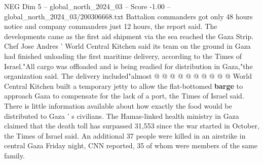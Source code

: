 \begin{textsample}{NEG Dim 5 – global\_north\_2024\_03 – Score -1.00 – global\_north\_2024\_03/200306668.txt}
Battalion commanders got only 48 hours notice and company commanders just 12 hours, the report said.
The developments came as the first aid shipment via the sea reached the Gaza Strip.
Chef Jose Andres ' World Central Kitchen said its team on the ground in Gaza had finished unloading the first maritime delivery, according to the Times of Israel."All cargo was offloaded and is being readied for distribution in Gaza,"the organization said.
The delivery included"almost @ @ @ @ @ @ @ @ @ @ World Central Kitchen built a temporary jetty to allow the flat-bottomed \textbf{barge} to approach Gaza to compensate for the lack of a port, the Times of Israel said.
There is little information available about how exactly the food would be distributed to Gaza ' s civilians.
The Hamas-linked health ministry in Gaza claimed that the death toll has surpassed 31,553 since the war started in October, the Times of Israel said.
An additional 37 people were killed in an airstrike in central Gaza Friday night, CNN reported, 35 of whom were members of the same family.

\end{textsample}
